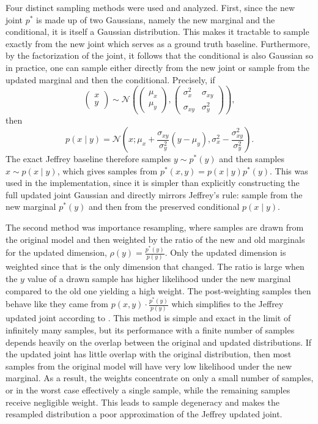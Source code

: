 Four distinct sampling methods were used and analyzed. First, since the new joint $p^*$ is made up of two Gaussians, namely the new marginal and the conditional, it is itself a Gaussian distribution. This makes it tractable to sample exactly from the new joint which serves as a ground truth baseline. Furthermore, by the factorization of the joint, it follows that the conditional is also Gaussian so in practice, one can sample either directly from the new joint or sample from the updated marginal and then the conditional. Precisely, if
\[
    \begin{pmatrix} x \\ y \end{pmatrix}
    \sim
    \mathcal{N}\left(
    \begin{pmatrix}
        \mu_x \\
        \mu_y
    \end{pmatrix},
    \begin{pmatrix}
        \sigma_x^2 & \sigma_{xy} \\
        \sigma_{xy} & \sigma_y^2
    \end{pmatrix}
    \right),
\]
then
\[
    p(x\mid y)
    =
    \mathcal{N}\left(
        x;
        \mu_x + \frac{\sigma_{xy}}{\sigma_y^2}(y-\mu_y),
        \sigma_x^2 - \frac{\sigma_{xy}^2}{\sigma_y^2}
    \right).
\]
The exact Jeffrey baseline therefore samples $y\sim p^*(y)$ and then samples $x\sim p(x\mid y)$, which gives samples from $p^*(x,y)=p(x\mid y)p^*(y)$. This was used in the implementation, since it is simpler than explicitly constructing the full updated joint Gaussian and directly mirrors Jeffrey's rule: sample from the new marginal $p^*(y)$ and then from the preserved conditional $p(x\mid y)$.

The second method was importance resampling, where samples are drawn from the original model and then weighted by the ratio of the new and old marginals for the updated dimension, $\rho(y) = \frac{p^*(y)}{p(y)}$. Only the updated dimension is weighted since that is the only dimension that changed. The ratio is large when the $y$ value of a drawn sample has higher likelihood under the new marginal compared to the old one yielding a high weight. The post-weighting samples then behave like they came from $p(x,y) \cdot \frac{p^*(y)}{p(y)}$ which simplifies to the Jeffrey updated joint according to \cite{MatteiJeffreysRule}. This method is simple and exact in the limit of infinitely many samples, but its performance with a finite number of samples depends heavily on the overlap between the original and updated distributions. If the updated joint has little overlap with the original distribution, then most samples from the original model will have very low likelihood under the new marginal. As a result, the weights concentrate on only a small number of samples, or in the worst case effectively a single sample, while the remaining samples receive negligible weight. This leads to sample degeneracy and makes the resampled distribution a poor approximation of the Jeffrey updated joint. 


